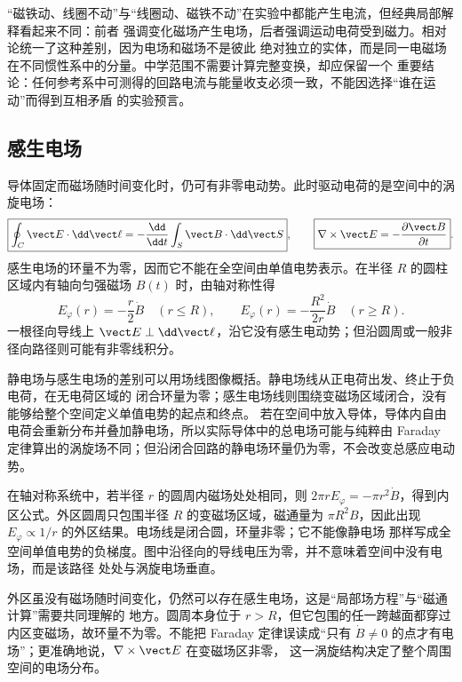 “磁铁动、线圈不动”与“线圈动、磁铁不动”在实验中都能产生电流，但经典局部解释看起来不同：前者
强调变化磁场产生电场，后者强调运动电荷受到磁力。相对论统一了这种差别，因为电场和磁场不是彼此
绝对独立的实体，而是同一电磁场在不同惯性系中的分量。中学范围不需要计算完整变换，却应保留一个
重要结论：任何参考系中可测得的回路电流与能量收支必须一致，不能因选择“谁在运动”而得到互相矛盾
的实验预言。

\movingLoopDiagram

\subsection*{感生电场}

导体固定而磁场随时间变化时，仍可有非零电动势。此时驱动电荷的是空间中的涡旋电场：
\begin{equation}
  \boxed{\oint_C\vect E\cdot\dd\vect\ell
  =-\frac{\dd}{\dd t}\int_S\vect B\cdot\dd\vect S},
  \qquad
  \boxed{\nabla\times\vect E=-\frac{\partial\vect B}{\partial t}}.
\end{equation}
感生电场的环量不为零，因而它不能在全空间由单值电势表示。在半径 $R$ 的圆柱区域内有轴向匀强磁场
$B(t)$ 时，由轴对称性得
\begin{equation}
  \boxed{E_\varphi(r)=-\frac r2\dot B\quad(r\le R)},
  \qquad
  \boxed{E_\varphi(r)=-\frac{R^2}{2r}\dot B\quad(r\ge R)}.
\end{equation}
一根径向导线上 $\vect E\perp\dd\vect\ell$，沿它没有感生电动势；但沿圆周或一般非径向路径则可能有非零线积分。

静电场与感生电场的差别可以用场线图像概括。静电场线从正电荷出发、终止于负电荷，在无电荷区域的
闭合环量为零；感生电场线则围绕变磁场区域闭合，没有能够给整个空间定义单值电势的起点和终点。
若在空间中放入导体，导体内自由电荷会重新分布并叠加静电场，所以实际导体中的总电场可能与纯粹由
Faraday 定律算出的涡旋场不同；但沿闭合回路的静电场环量仍为零，不会改变总感应电动势。

在轴对称系统中，若半径 $r$ 的圆周内磁场处处相同，则
$2\pi rE_\varphi=-\pi r^2\dot B$，得到内区公式。外区圆周只包围半径 $R$ 的变磁场区域，磁通量为
$\pi R^2B$，因此出现 $E_\varphi\propto1/r$ 的外区结果。电场线是闭合圆，环量非零；它不能像静电场
那样写成全空间单值电势的负梯度。图中沿径向的导线电压为零，并不意味着空间中没有电场，而是该路径
处处与涡旋电场垂直。

外区虽没有磁场随时间变化，仍然可以存在感生电场，这是“局部场方程”与“磁通计算”需要共同理解的
地方。圆周本身位于 $r>R$，但它包围的任一跨越面都穿过内区变磁场，故环量不为零。不能把 Faraday
定律误读成“只有 $\dot B\ne0$ 的点才有电场”；更准确地说，$\nabla\times\vect E$ 在变磁场区非零，
这一涡旋结构决定了整个周围空间的电场分布。

